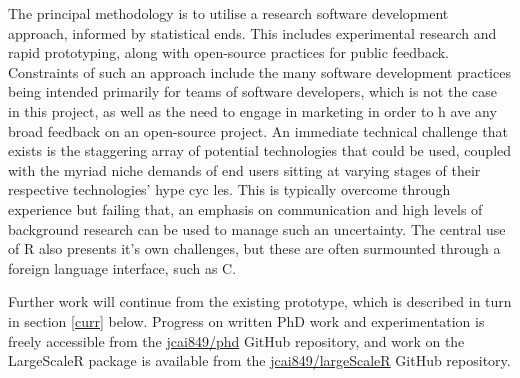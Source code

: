 The principal methodology is to utilise a research software development approach, informed by statistical ends.
This includes experimental research and rapid prototyping, along with open-source practices for public feedback.
Constraints of such an approach include the many software development practices being intended primarily for teams of software developers, which is not the case in this project, as well as the need to engage in marketing in order to h    ave any broad feedback on an open-source project.
An immediate technical challenge that exists is the staggering array of potential technologies that could be used, coupled with the myriad niche demands of end users sitting at varying stages of their respective technologies' hype cyc    les.
This is typically overcome through experience but failing that, an emphasis on communication and high levels of background research can be used to manage such an uncertainty.
The central use of R also presents it's own challenges, but these are often surmounted through a foreign language interface, such as C.

Further work will continue from the existing prototype, which is described in turn in section \ref{curr} below.
Progress on written PhD work and experimentation is freely accessible from the \href{https://github.com/jcai849/phd}{jcai849/phd} GitHub repository, and work on the LargeScaleR package is available from the \href{https://github.com/jcai849/phd}{jcai849/largeScaleR} GitHub repository.
